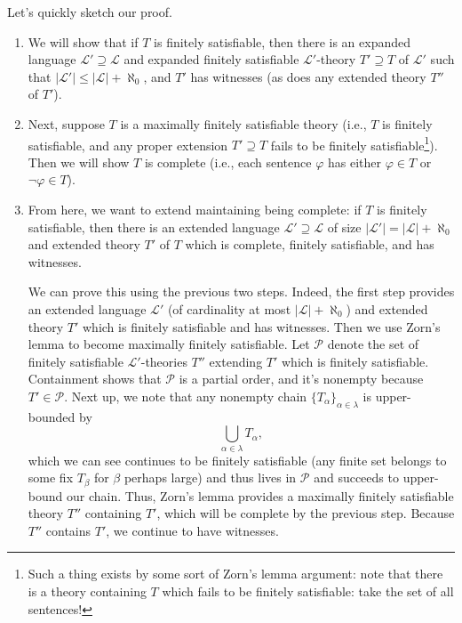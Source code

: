 \documentclass[../notes.tex]{subfiles}
\begin{document}
Let's quickly sketch our proof.
\begin{enumerate}
	\item We will show that if $T$ is finitely satisfiable, then there is an expanded language $\mathcal L'\supseteq\mathcal L$ and expanded finitely satisfiable $\mathcal L'$-theory $T'\supseteq T$ of $\mathcal L'$ such that $\left|\mathcal L'\right|\le\left|\mathcal L\right|+\aleph_0$, and $T'$ has witnesses (as does any extended theory $T''$ of $T'$).

	\item Next, suppose $T$ is a maximally finitely satisfiable theory (i.e., $T$ is finitely satisfiable, and any proper extension $T'\supseteq T$ fails to be finitely satisfiable\footnote{Such a thing exists by some sort of Zorn's lemma argument: note that there is a theory containing $T$ which fails to be finitely satisfiable: take the set of all sentences!}). Then we will show $T$ is complete (i.e., each sentence $\varphi$ has either $\varphi\in T$ or $\lnot\varphi\in T$).

	\item From here, we want to extend maintaining being complete: if $T$ is finitely satisfiable, then there is an extended language $\mathcal L'\supseteq\mathcal L$ of size $\left|\mathcal L'\right|=\left|\mathcal L\right|+\aleph_0$ and extended theory $T'$ of $T$ which is complete, finitely satisfiable, and has witnesses.

	We can prove this using the previous two steps. Indeed, the first step provides an extended language $\mathcal L'$ (of cardinality at most $\left|\mathcal L\right|+\aleph_0$) and extended theory $T'$ which is finitely satisfiable and has witnesses. Then we use Zorn's lemma to become maximally finitely satisfiable. Let $\mathcal P$ denote the set of finitely satisfiable $\mathcal L'$-theories $T''$ extending $T'$ which is finitely satisfiable. Containment shows that $\mathcal P$ is a partial order, and it's nonempty because $T'\in\mathcal P$. Next up, we note that any nonempty chain $\{T_\alpha\}_{\alpha\in\lambda}$ is upper-bounded by
	\[\bigcup_{\alpha\in\lambda}T_\alpha,\]
	which we can see continues to be finitely satisfiable (any finite set belongs to some fix $T_\beta$ for $\beta$ perhaps large) and thus lives in $\mathcal P$ and succeeds to upper-bound our chain. Thus, Zorn's lemma provides a maximally finitely satisfiable theory $T''$ containing $T'$, which will be complete by the previous step. Because $T''$ contains $T'$, we continue to have witnesses.


\end{enumerate}
\end{document}
